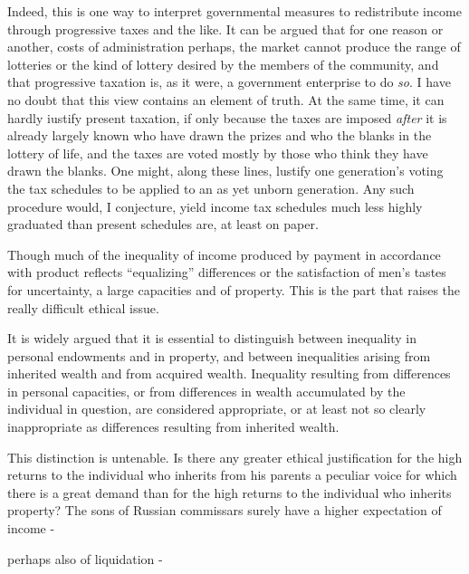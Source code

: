 \documentclass[11pt,openany]{book}
\begin{document}
Indeed, this is one way to interpret governmental measures to redistribute income through progressive taxes and the like. It can be argued that for one reason or another, costs of administration perhaps, the market cannot produce the range of lotteries or the kind of lottery desired by the members of the community, and that progressive taxation is, as it were, a government enterprise to do \emph{so}. I have no doubt that this view contains an element of truth. At the same time, it can hardly iustify present taxation, if only because the taxes are imposed \emph{after} it is already largely known who have drawn the prizes and who the blanks in the lottery of life, and the taxes are voted mostly by those who think they have drawn the blanks. One might, along these lines, lustify one generation's voting the tax schedules to be applied to an as yet unborn generation. Any such procedure would, I conjecture, yield income tax schedules much less highly graduated than present schedules are, at least on paper.

Though much of the inequality of income produced by payment in accordance with product reflects ``equalizing'' differences or the satisfaction of men's tastes for uncertainty, a large capacities and of property. This is the part that raises the really difficult ethical issue.

It is widely argued that it is essential to distinguish between inequality in personal endowments and in property, and between inequalities arising from inherited wealth and from acquired wealth. Inequality resulting from differences in personal capacities, or from differences in wealth accumulated by the individual in question, are considered appropriate, or at least not so clearly inappropriate as differences resulting from inherited wealth.

This distinction is untenable. Is there any greater ethical justification for the high returns to the individual who inherits from his parents a peculiar voice for which there is a great demand than for the high returns to the individual who inherits property? The sons of Russian commissars surely have a higher expectation of income -

perhaps also of liquidation -
\end{document}
